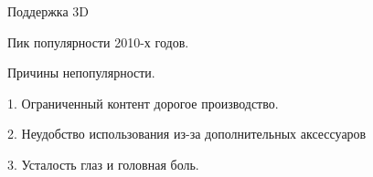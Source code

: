 \documentclass{beamer}
\begin{document}
\begin{frame}{Поддержка 3D}
{			\footnotesize
			Пик популярности 2010-х годов.

			Причины непопулярности.
				
				1. Ограниченный контент дорогое производство.
	
				2. Неудобство использования из-за дополнительных аксессуаров
	
				3. Усталость глаз и головная боль.

		}

	\end{frame}



		
\end{document}
